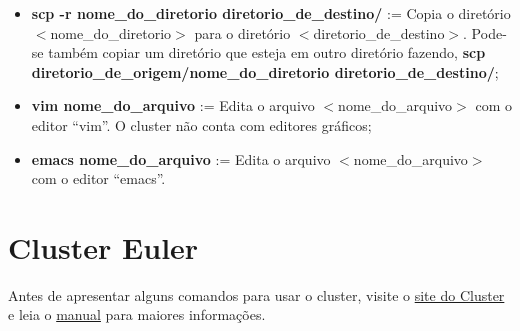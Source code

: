 \documentclass[12pt]{article}
\begin{document}
\begin{itemize}
	\item \textbf{scp -r nome\_do\_diretorio diretorio\_de\_destino/} := Copia o diretório $<$nome\_do\_diretorio$>$ para o diretório $<$diretorio\_de\_destino$>$. Pode-se também copiar um diretório que esteja em outro diretório fazendo, \textbf{scp diretorio\_de\_origem/nome\_do\_diretorio diretorio\_de\_destino/};
	\item \textbf{vim nome\_do\_arquivo} := Edita o arquivo $<$nome\_do\_arquivo$>$ com o editor ``vim''. O cluster não conta com editores gráficos;
	\item \textbf{emacs nome\_do\_arquivo} := Edita o arquivo $<$nome\_do\_arquivo$>$ com o editor ``emacs''.
\end{itemize}

\section{Cluster Euler}\label{sec:cluster_euler}

Antes de apresentar alguns comandos para usar o cluster, visite o \href{http://www.cemeai.icmc.usp.br/Euler/index.html}{site do Cluster} e leia o \href{http://resources.altair.com/pbs/documentation/support/PBSProUserGuide12.2.pdf}{manual} para maiores informações.
\end{document}
